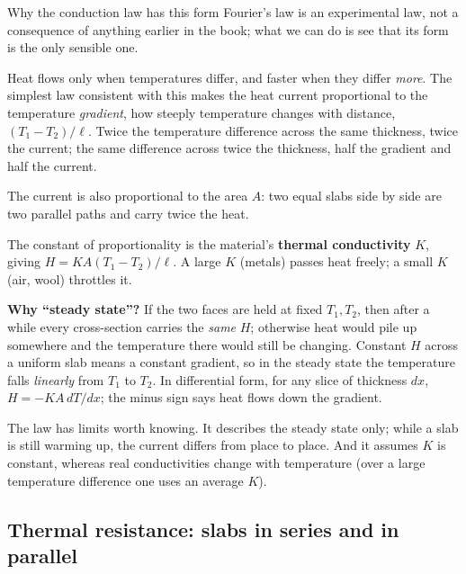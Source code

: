 \begin{derivbox}{Why the conduction law has this form}
Fourier's law is an experimental law, not a consequence of anything earlier in the book; what we can
do is see that its form is the only sensible one.

 Heat flows only when temperatures differ, and faster when they differ \emph{more}. The
simplest law consistent with this makes the heat current proportional to the temperature
\emph{gradient}, how steeply temperature changes with distance, $(T_1-T_2)/\ell$. Twice the
temperature difference across the same thickness, twice the current; the same difference across twice
the thickness, half the gradient and half the current.

 The current is also proportional to the area $A$: two equal slabs side by side are two
parallel paths and carry twice the heat.

 The constant of proportionality is the material's \textbf{thermal conductivity} $K$, giving
$H = KA(T_1-T_2)/\ell$. A large $K$ (metals) passes heat freely; a small $K$ (air, wool) throttles it.

 \textbf{Why ``steady state''?} If the two faces are held at fixed $T_1, T_2$, then after a
while every cross-section carries the \emph{same} $H$; otherwise heat would pile up somewhere and the
temperature there would still be changing. Constant $H$ across a uniform slab means a constant gradient,
so in the steady state the temperature falls \emph{linearly} from $T_1$ to $T_2$. In differential form,
for any slice of thickness $dx$, $H=-KA\,dT/dx$; the minus sign says heat flows down the gradient.
\end{derivbox}

The law has limits worth knowing. It describes the steady state only; while a slab is still warming up,
the current differs from place to place. And it assumes $K$ is constant, whereas real conductivities
change with temperature (over a large temperature difference one uses an average $K$).

\subsection{Thermal resistance: slabs in series and in parallel}

